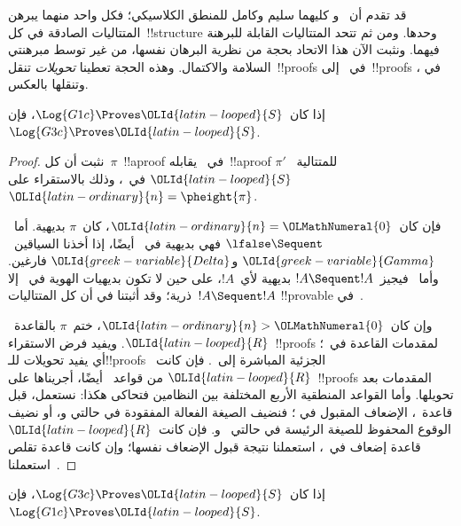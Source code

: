 \documentclass[../../../include/open-logic-section]{subfiles}
\begin{document}


قد تقدم أن~ و كليهما سليم وكامل للمنطق الكلاسيكي؛
فكل واحد منهما يبرهن المتتاليات الصادقة في كل~!!{structure} وحدها. ومن
ثم تتحد المتتاليات القابلة للبرهنة فيهما. ونثبت الآن هذا الاتحاد بحجة
من نظرية البرهان نفسها، من غير توسط مبرهنتي السلامة والاكتمال. وهذه الحجة
تعطينا \emph{تحويلات} تنقل~!!{proof}s في~ إلى~!!{proof}s في
، وتنقلها بالعكس.

\begin{prop}
إذا كان~$\Log{G1c}\Proves \OLId{latin-looped}{S}$، فإن~$\Log{G3c}\Proves \OLId{latin-looped}{S}$.
\end{prop}

\begin{proof}
  نثبت أن كل~$\pi$~!!a{proof} في~ يقابله~!!a{proof}
  $\pi'$ للمتتالية~$\OLId{latin-looped}{S}$ في~، وذلك بالاستقراء على
  $\OLId{latin-ordinary}{n}=\pheight{\pi}$.

  فإن كان~$\OLId{latin-ordinary}{n}=\OLMathNumeral{0}$، كان~$\pi$ بديهية. أما~$\lfalse\Sequent\quad$ فهي
  بديهية في~ أيضًا، إذا أخذنا السياقين~$\OLId{greek-variable}{Gamma}$ و$\OLId{greek-variable}{Delta}$
  فارغين. وأما~ فيجيز~$!A\Sequent !A$ بديهية لأي~$!A$، على
  حين لا تكون بديهيات الهوية في~ إلا ذرية؛ وقد أثبتنا في
   أن كل المتتاليات~$!A\Sequent !A$
  !!{provable} في~.

  وإن كان~$\OLId{latin-ordinary}{n}>\OLMathNumeral{0}$، ختم~$\pi$ بالقاعدة~$\OLId{latin-looped}{R}$. ويفيد فرض الاستقراء~!!{proof}s
  لمقدمات القاعدة في~؛ أي يفيد تحويلات للـ!!{proof}s الجزئية
  المباشرة إلى~. فإن كانت~$\OLId{latin-looped}{R}$ من قواعد~ أيضًا، أجريناها
  على~!!{proof}s المقدمات بعد تحويلها. وأما القواعد المنطقية الأربع المختلفة بين
  النظامين فتحاكى هكذا: نستعمل، قبل قاعدة~، الإضعاف المقبول في
  ؛ فنضيف الصيغة الفعالة المفقودة في حالتي
  \LeftR{\land} و\RightR{\lor}، أو نضيف الوقوع المحفوظ للصيغة الرئيسة
  في حالتي~\LeftR{\lforall} و\RightR{\lexists}. فإن كانت~$\OLId{latin-looped}{R}$ قاعدة
  إضعاف في~، استعملنا نتيجة قبول الإضعاف نفسها؛ وإن كانت قاعدة
  تقلص استعملنا~.
\end{proof}

\begin{prop}
إذا كان~$\Log{G3c}\Proves \OLId{latin-looped}{S}$، فإن~$\Log{G1c}\Proves \OLId{latin-looped}{S}$.
\end{prop}
\end{document}
